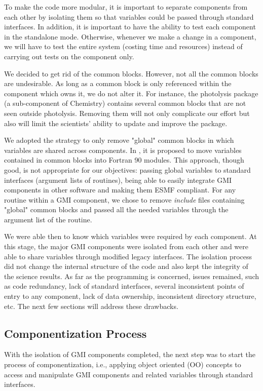 \documentclass[11pt]{article}
\begin{document}
To make the code more modular, it is important to separate components from each other
by isolating them so that variables could be passed through standard interfaces.
In addition, it is important to have the ability to test each component in the 
standalone mode. 
Otherwise, whenever we make a change in a component, we will have to test the
entire system (costing time and resources) instead of carrying out tests on the 
component only.

We decided to get rid of the common blocks. However, not all the common blocks are
undesirable. As long as a common block is only referenced within the component 
which owns it, 
we do not alter it. For instance, the photolysis package (a sub-component of Chemistry)
contains several common blocks that are not seen outside photolysis. 
Removing them will not only complicate our effort but also will limit the scientists' 
ability to update and improve the package.

We adopted the strategy to only remove "global" common blocks in which variables are 
shared across components.
In \cite{Decyk-etal98, Decyk-etal, Norton-Decyk01}, it is proposed to move variables
contained in common blocks into Fortran 90 modules. 
This approach, though good, is not appropriate for our objectives: 
passing global variables to standard interfaces (argument lists of routines), 
being able to easily integrate GMI 
components in other software and making them ESMF compliant.
For any routine within a GMI component,  we chose to remove {\em include} files 
containing "global" common blocks and passed all the needed variables through 
the argument list of the routine.

We were able then to know which variables were required by each component. 
At this stage, the major GMI components were isolated from each other and were able to 
share variables through modified legacy interfaces.
The isolation process did not change the internal structure of the code and
also kept the integrity of the science results.
As far as the programming is concerned, issues remained, such as code redundancy,
lack of standard interfaces, several inconsistent points of entry to any component,
lack of data ownership, inconsistent directory structure, etc.
The next few sections will address these drawbacks.
%
%
\subsection{Componentization Process}
%
With the isolation of GMI components completed, the next step was to start the 
process of componentization, i.e., applying object oriented (OO) concepts to 
access and manipulate GMI components and related variables through standard 
interfaces.
\end{document}
